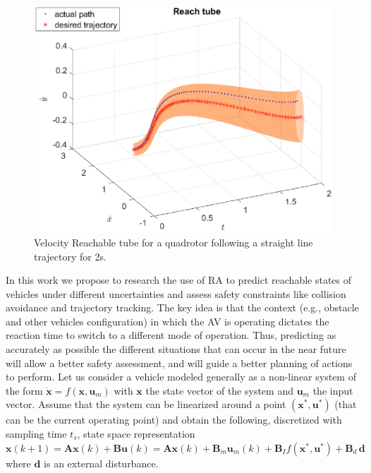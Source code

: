 \begin{figure}
\vspace{-5pt}
\centering
\includegraphics[width = \linewidth ]{fig/reach_set_vel.eps} 
\caption{Velocity Reachable tube for a quadrotor following a straight line trajectory for 2s.}
\vspace{-5pt}
\label{fig:reach_set}\end{figure}
In this work we propose to research the use of RA to predict reachable states of vehicles under different uncertainties and assess safety constraints like collision avoidance and trajectory tracking. The key idea is that the context (e.g., obstacle and other vehicles configuration) in which the AV is operating dictates the reaction time to switch to a different mode of operation. Thus, predicting as accurately as possible the different situations that can occur in the near future will allow a better safety assessment,  and will guide a better planning of actions to perform.
 Let us consider a vehicle modeled generally as a non-linear system of the form $\dot{\bm{x}} = f(\bm{x}, \bm{u}_m)$ with $\bm{x}$ the state vector of the system and $\bm{u}_m$ the input vector.
Assume that the system can be linearized around a point $\left(\bm{x}^{*}, \bm{u}^{*}\right)$ (that can be the current operating point) and obtain the following, discretized with sampling time $t_s$, state space representation $\bm{x}(k+1) =  \bm{A} \bm{x}(k) + \bm{B} \bm{u}(k) =  \bm{A} \bm{x}(k) + \bm{B}_m \bm{u}_m(k) + \bm{B}_I f\left(\bm{x}^{*}, \bm{u}^{*}\right) + \bm{B}_d \, \bm{d}$
where $\bm{d}$ is an external disturbance.  %


